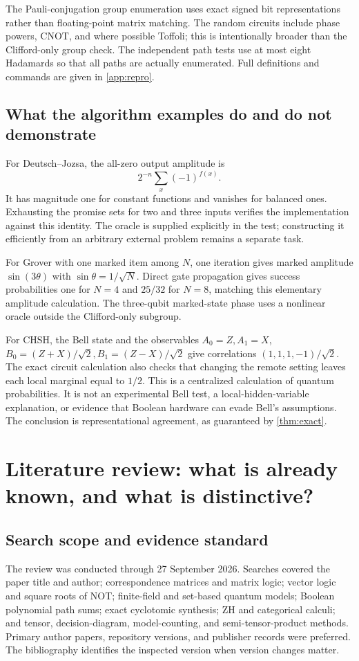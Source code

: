The Pauli-conjugation group enumeration uses exact signed bit representations rather than floating-point matrix matching. The random circuits include phase powers, CNOT, and where possible Toffoli; this is intentionally broader than the Clifford-only group check. The independent path tests use at most eight Hadamards so that all paths are actually enumerated. Full definitions and commands are given in \cref{app:repro}.

\subsection{What the algorithm examples do and do not demonstrate}
For Deutsch--Jozsa, the all-zero output amplitude is
\begin{equation}
 2^{-n}\sum_x(-1)^{f(x)}.
\end{equation}
It has magnitude one for constant functions and vanishes for balanced ones. Exhausting the promise sets for two and three inputs verifies the implementation against this identity. The oracle is supplied explicitly in the test; constructing it efficiently from an arbitrary external problem remains a separate task.

For Grover with one marked item among $N$, one iteration gives marked amplitude $\sin(3\theta)$ with $\sin\theta=1/\sqrt N$. Direct gate propagation gives success probabilities one for $N=4$ and $25/32$ for $N=8$, matching this elementary amplitude calculation. The three-qubit marked-state phase uses a nonlinear oracle outside the Clifford-only subgroup.

For CHSH, the Bell state and the observables $A_0=Z,A_1=X$, $B_0=(Z+X)/\sqrt2,B_1=(Z-X)/\sqrt2$ give correlations $(1,1,1,-1)/\sqrt2$. The exact circuit calculation also checks that changing the remote setting leaves each local marginal equal to $1/2$. This is a centralized calculation of quantum probabilities. It is not an experimental Bell test, a local-hidden-variable explanation, or evidence that Boolean hardware can evade Bell's assumptions. The conclusion is representational agreement, as guaranteed by \cref{thm:exact}.

\section{Literature review: what is already known, and what is distinctive?}\label{sec:literature}
\subsection{Search scope and evidence standard}
The review was conducted through 27 September 2026. Searches covered the paper title and author; correspondence matrices and matrix logic; vector logic and square roots of NOT; finite-field and set-based quantum models; Boolean polynomial path sums; exact cyclotomic synthesis; ZH and categorical calculi; and tensor, decision-diagram, model-counting, and semi-tensor-product methods. Primary author papers, repository versions, and publisher records were preferred. The bibliography identifies the inspected version when version changes matter.

